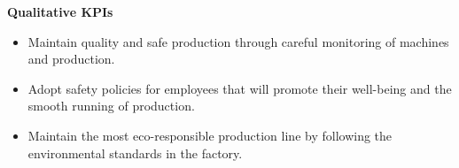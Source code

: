 \textbf{Qualitative KPIs}
\begin{itemize}
    \item Maintain quality and safe production through careful monitoring of machines and production.
    \item Adopt safety policies for employees that will promote their well-being and the smooth running of production.
    \item Maintain the most eco-responsible production line by following the environmental standards in the factory.
\end{itemize}

